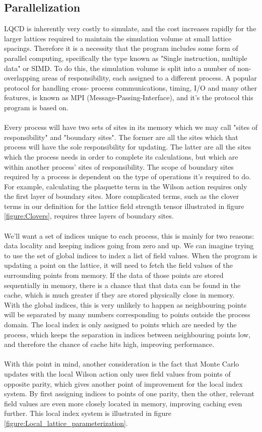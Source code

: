 \documentclass[a4paper,10pt]{article}
\begin{document}
\subsection{Parallelization}
LQCD is inherently very costly to simulate, and the cost increases rapidly for the larger lattices required to maintain the simulation volume at small lattice spacings. Therefore it is a necessity that the program includes some form of parallel computing, specifically the type known as "Single instruction, multiple data" or SIMD. To do this, the simulation volume is split into a number of non-overlapping areas of responsibility, each assigned to a different process. A popular protocol for handling cross- process communications, timing, I/O and many other features, is known as MPI (Message-Passing-Interface), and it's the protocol this program is based on.\\\\Every process will have two sets of sites in its memory which we may call "sites of responsibility" and "boundary sites". The former are all the sites which that process will have the sole responsibility for updating. The latter are all the sites which the process needs in order to complete its calculations, but which are within another process' sites of responsibility. The scope of boundary sites required by a process is dependent on the type of operations it's required to do. For example, calculating the plaquette term in the Wilson action requires only the first layer of boundary sites. More complicated terms, such as the clover terms in our definition for the lattice field strength tensor  illustrated in figure \ref{figure:Clovers}, requires three layers of boundary sites.\\\\We'll want a set of indices unique to each process, this is mainly for two reasons: data locality and keeping indices going from zero and up.
We can imagine trying to use the set of global indices to index a list of field values. When the program is updating a point on the lattice, it will need to fetch the field values of the surrounding points from memory. If the data of those points are stored sequentially in memory, there is a chance that that data can be found in the cache, which is much greater if they are stored physically close in memory.\\With the global indices, this is very unlikely to happen as neighbouring points will be separated by many numbers corresponding to points outside the process domain. The local index is only assigned to points which are needed by the process, which keeps the separation in indices between neighbouring points low, and therefore the chance of cache hits high, improving performance.\\\\With this point in mind, another consideration is the fact that Monte Carlo updates with the local Wilson action only uses field values from points of opposite parity, which gives another point of improvement for the local index system. By first assigning indices to points of one parity, then the other, relevant field values are even more closely located in memory, improving caching even further. This local index system is illustrated in figure \ref{figure:Local_lattice_parameterization}.
\end{document}
